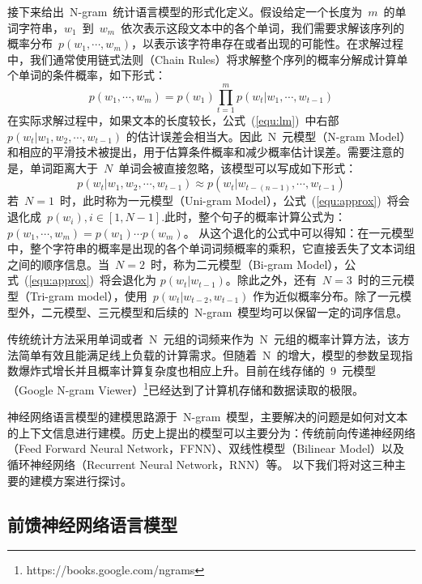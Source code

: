 接下来给出~N-gram~统计语言模型的形式化定义。假设给定一个长度为~$m$~的单词字符串，$w_1$~到~$w_m$~依次表示这段文本中的各个单词，我们需要求解该序列的概率分布~$p(w_1,\cdots,w_m)$，以表示该字符串存在或者出现的可能性。在求解过程中，我们通常使用链式法则（Chain Rules）将求解整个序列的概率分解成计算单个单词的条件概率，如下形式：
\begin{equation}
\label{equ:lm}
p(w_1,\cdots,w_m) =p(w_1)\prod_{t=1}^{m}p(w_t|w_1,\cdots,w_{t-1})
\end{equation}
在实际求解过程中，如果文本的长度较长，公式~(\ref{equ:lm})~中右部~$p(w_t | w_1,w_2,\cdots,w_{t-1}) $ 的估计误差会相当大。因此~N~元模型（N-gram Model）和相应的平滑技术被提出，用于估算条件概率和减少概率估计误差。需要注意的是，单词距离大于~$N$~单词会被直接忽略，该模型可以写成如下形式：
\begin{equation}
\label{equ:approx}
p(w_t | w_1,w_2,\cdots,w_{t-1})  \approx p(w_t | w_{t-(n-1)},\cdots,w_{t-1})
\end{equation}
若~$N=1$~时，此时称为一元模型（Uni-gram Model），公式~(\ref{equ:approx})~将会退化成~$p(w_i),i\in [1,N-1]$.此时，整个句子的概率计算公式为：~$p(w_1,\cdots,w_m) = p(w_1)\cdots p(w_m)$。
从这个退化的公式中可以得知：在一元模型中，整个字符串的概率是出现的各个单词词频概率的乘积，它直接丢失了文本词组之间的顺序信息。当~$N=2$~时，称为二元模型（Bi-gram Model），公式~(\ref{equ:approx})~将会退化为 $p(w_t|w_{t-1})$。除此之外，还有~$N=3$~时的三元模型（Tri-gram model），使用~$p(w_t |w_{t-2},w_{t-1})$ 作为近似概率分布。除了一元模型外，二元模型、三元模型和后续的~N-gram~模型均可以保留一定的词序信息。

传统统计方法采用单词或者~N~元组的词频来作为~N~元组的概率计算方法，该方法简单有效且能满足线上负载的计算需求。但随着~N~的增大，模型的参数呈现指数爆炸式增长并且概率计算复杂度也相应上升。目前在线存储的~9~元模型（Google N-gram Viewer）\footnote{https://books.google.com/ngrams}已经达到了计算机存储和数据读取的极限。


神经网络语言模型的建模思路源于~N-gram~模型，主要解决的问题是如何对文本的上下文信息进行建模。历史上提出的模型可以主要分为：传统前向传递神经网络（Feed Forward Neural Network，FFNN）、双线性模型（Bilinear Model）以及循环神经网络（Recurrent Neural Network，RNN）等。 以下我们将对这三种主要的建模方案进行探讨。


\subsection{前馈神经网络语言模型}

